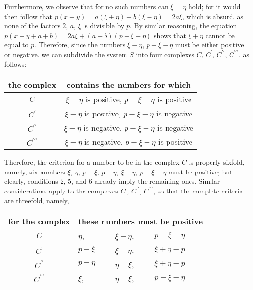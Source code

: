 \documentclass[twoside,12pt]{memoir}
\begin{document}
Furthermore, we observe that for no such numbers can \(\xi=\eta\) hold; for it would then follow that \(p(x+y)=a(\xi+\eta)+b(\xi-\eta)=2a\xi\), which is absurd, as none of the factors \(2\), \(a\), \(\xi\) is divisible by \(p\). By similar reasoning, the equation \(p(x-y+a+b)=2a\xi+(a+b)(p-\xi-\eta)\) shows that \(\xi+\eta\) cannot be equal to \(p\). Therefore, since the numbers \(\xi-\eta\), \(p-\xi-\eta\) must be either positive or negative, we can subdivide the system \(S\) into four complexes \(C\), \(C^{\prime}\), \(C^{\prime\prime}\), \(C^{\prime\prime\prime}\), as follows:
\begin{center}
\begin{tabular}{c|c}
the complex & contains the numbers for which \\
\hline
\(C\) & \(\xi-\eta\) is positive, \(p-\xi-\eta\) is positive \\
\(C^{\prime}\) & \(\xi-\eta\) is positive, \(p-\xi-\eta\) is negative \\
\(C^{\prime \prime}\) & \(\xi-\eta\) is negative, \(p-\xi-\eta\) is negative \\
\(C^{\prime \prime \prime}\) & \(\xi-\eta\) is negative, \(p-\xi-\eta\) is positive \\
\end{tabular}
\end{center}
Therefore, the criterion for a number to be in the complex \(C\) is properly sixfold, namely, six numbers \(\xi\), \(\eta\), \(p-\xi\), \(p-\eta\), \(\xi-\eta\), \(p-\xi-\eta\) must be positive; but clearly, conditions 2, 5, and 6 already imply the remaining ones. Similar considerations apply to the complexes \(C^{\prime}\), \(C^{\prime\prime}\), \(C^{\prime\prime\prime}\), so that the complete criteria are threefold, namely,\pagebreak%
\begin{center}
\begin{tabular}{c|lll}
for the complex & \multicolumn{3}{c}{these numbers must be positive}   \\
\hline
\(C\) & \(\eta\), & \(\xi-\eta\), & \(p-\xi-\eta\) \\
\(C^{\prime}\) & \(p-\xi\) & \(\xi-\eta\), & \(\xi+\eta-p\)   \\
\(C^{\prime \prime}\) & \(p-\eta\)& \(\eta-\xi\), & \(\xi+\eta-p\)   \\
\(C^{\prime \prime \prime}\) & \(\xi\), & \(\eta-\xi\), & \(p-\xi-\eta\) \\
\end{tabular}
\end{center}
\end{document}
